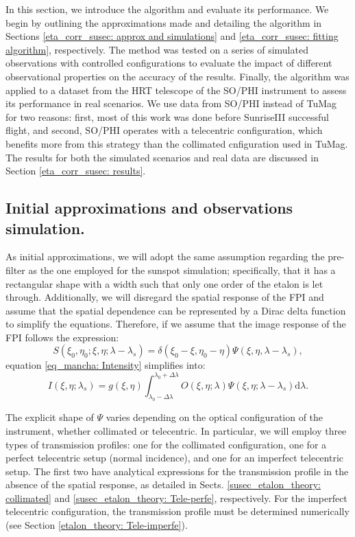 In this section, we introduce the algorithm and evaluate its performance. We begin by outlining the approximations made and detailing the algorithm in Sections \ref{eta_corr_susec: approx and simulations} and \ref{eta_corr_susec: fitting algorithm}, respectively. The method was tested on a series of simulated observations with controlled configurations to evaluate the impact of different observational properties on the accuracy of the results. Finally, the algorithm was applied to a dataset from the HRT telescope of the SO/PHI instrument to assess its performance in real scenarios. We use data from SO/PHI instead of TuMag for two reasons: first, most of this work was done before SunriseIII successful flight, and second, SO/PHI operates with a telecentric configuration, which benefits more from this strategy than the collimated cnfiguration used in TuMag. The results for both the simulated scenarios and real data are discussed in Section \ref{eta_corr_susec: results}.

\subsection{\label{eta_corr_susec: approx and simulations}Initial approximations and observations simulation.}

As initial approximations, we will adopt the same assumption regarding the pre-filter as the one employed for the sunspot simulation; specifically, that it has a rectangular shape with a width such that only one order of the etalon is let through. Additionally, we will disregard the spatial response of the FPI and assume that the spatial dependence can be represented by a Dirac delta function to simplify the equations. Therefore, if we assume that the image response of the FPI follows the expression:
\begin{equation}
S\left(\xi_0, \eta_0; \xi , \eta; \lambda-\lambda_{s}\right)=\delta(\xi_0-\xi,\eta_0-\eta)\Psi(\xi,\eta,\lambda-\lambda_s),
\end{equation}
equation \eqref{eq_mancha: Intensity} simplifies into:
\begin{equation}
    I\left(\xi, \eta ; \lambda_{s}\right)=g(\xi, \eta)\int_{\lambda _ 0 - \Delta \lambda}^{\lambda _ 0 + \Delta \lambda} O\left(\xi, \eta ; \lambda\right) \Psi\left(\xi, \eta ; \lambda-\lambda_{s}\right)  \mathrm{d} \lambda.
    \label{eq_eta_corr: intensity}
\end{equation}

The explicit shape of $\Psi$ varies depending on the optical configuration of the instrument, whether collimated or telecentric. In particular, we will employ three types of transmission profiles: one for the collimated configuration, one for a perfect telecentric setup (normal incidence), and one for an imperfect telecentric setup. The first two have analytical expressions for the transmission profile in the absence of the spatial response, as detailed in Sects. \ref{susec_etalon_theory: collimated} and \ref{susec_etalon_theory: Tele-perfe}, respectively. For the imperfect telecentric configuration, the transmission profile must be determined numerically (see Section \ref{etalon_theory: Tele-imperfe}).
  
